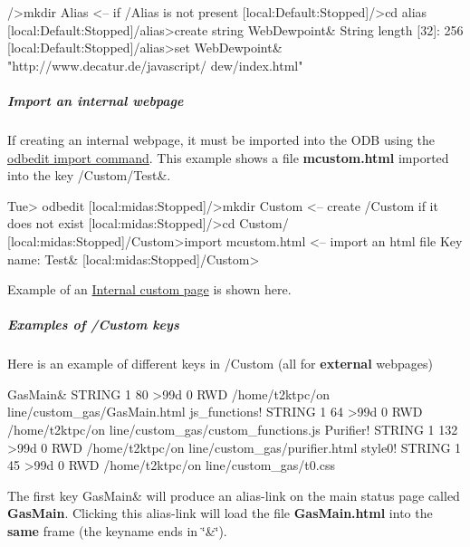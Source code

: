 \begin{DoxyCode}
/>mkdir Alias  <-- if /Alias is not present
[local:Default:Stopped]/>cd alias
[local:Default:Stopped]/alias>create string WebDewpoint&
String length [32]: 256
[local:Default:Stopped]/alias>set WebDewpoint& "http://www.decatur.de/javascript/
      dew/index.html"
\end{DoxyCode}
\hypertarget{RC_mhttpd_Activate_RC_odb_custom_internal_example}{}\subparagraph{Import an internal webpage}\label{RC_mhttpd_Activate_RC_odb_custom_internal_example}
If creating an internal webpage, it must be imported into the ODB using the \hyperlink{RC_odbedit_examples_RC_odbedit_import}{odbedit import command}. This example shows a file {\bfseries mcustom.html} imported into the key /Custom/Test\&.


\begin{DoxyCode}
  Tue> odbedit                      
  [local:midas:Stopped]/>mkdir Custom    <-- create /Custom if it does not exist
  [local:midas:Stopped]/>cd Custom/
  [local:midas:Stopped]/Custom>import mcustom.html   <-- import an html file
  Key name: Test&              
  [local:midas:Stopped]/Custom>
\end{DoxyCode}


Example of an \hyperlink{RC_mhttpd_Internal}{Internal custom page} is shown here.\hypertarget{RC_mhttpd_Activate_RC_odb_custom_keys_examples}{}\subparagraph{Examples of /Custom keys}\label{RC_mhttpd_Activate_RC_odb_custom_keys_examples}
Here is an example of different keys in /Custom (all for {\bfseries external} webpages) 
\begin{DoxyCode}
GasMain&                        STRING  1     80    >99d 0   RWD  /home/t2ktpc/on
      line/custom_gas/GasMain.html
js_functions!                   STRING  1     64    >99d 0   RWD  /home/t2ktpc/on
      line/custom_gas/custom_functions.js
Purifier!                       STRING  1     132   >99d 0   RWD  /home/t2ktpc/on
      line/custom_gas/purifier.html
style0!                         STRING  1     45    >99d 0   RWD  /home/t2ktpc/on
      line/custom_gas/t0.css                    
\end{DoxyCode}



\begin{DoxyItemize}
\item The first key GasMain\& will produce an alias-\/link on the main status page called {\bfseries GasMain}. Clicking this alias-\/link will load the file {\bfseries GasMain.html} into the {\bfseries same} frame (the keyname ends in \char`\"{}\&\char`\"{}).
\end{DoxyItemize}

